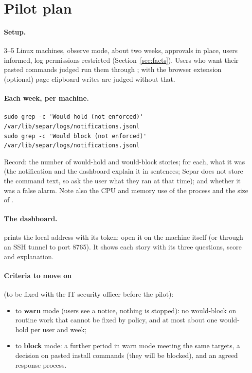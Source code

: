 \documentclass[11pt,a4paper]{article}
\begin{document}
\section{Pilot plan}
\label{sec:pilot}

\paragraph{Setup.} 3--5 Linux machines, observe mode, about two weeks, approvals in place, users
informed, log permissions restricted (Section~\ref{sec:facts}). Users who want their pasted commands
judged run them through ; with the browser extension (optional) page
clipboard writes are judged without that.

\paragraph{Each week, per machine.}
\begin{lstlisting}
sudo grep -c 'Would hold (not enforced)'  /var/lib/separ/logs/notifications.jsonl
sudo grep -c 'Would block (not enforced)' /var/lib/separ/logs/notifications.jsonl
\end{lstlisting}
Record: the number of would-hold and would-block stories; for each, what it was (the notification and
the dashboard explain it in sentences; Separ does not store the command text, so ask the user what
they ran at that time); and whether it was a false alarm. Note also the CPU and memory use of the
 process and the size of .

\paragraph{The dashboard.}  prints the
local address with its token; open it on the machine itself (or through an SSH tunnel to port
8765). It shows each story with its three questions, score and explanation.

\paragraph{Criteria to move on} (to be fixed with the IT security officer before the pilot):
\begin{itemize}
  \item to \textbf{warn} mode (users see a notice, nothing is stopped): no would-block on routine
    work that cannot be fixed by policy, and at most about one would-hold per user and week;
  \item to \textbf{block} mode: a further period in warn mode meeting the same targets, a decision
    on pasted install commands (they will be blocked), and an agreed response process.
\end{itemize}
\end{document}
